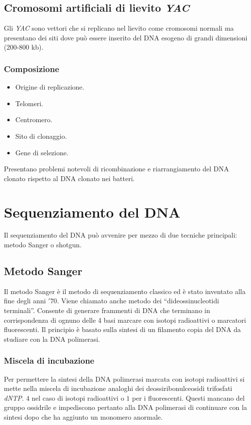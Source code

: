 	\subsection{Cromosomi artificiali di lievito \emph{YAC}}
	Gli \emph{YAC} sono vettori che si replicano nel lievito come cromosomi normali ma presentano dei siti dove pu\`o essere inserito del DNA esogeno di grandi dimensioni (200-800 kb).
	
		\subsubsection{Composizione}
		\begin{multicols}{2}
			\begin{itemize}
				\item Origine di replicazione.
				\item Telomeri.
				\item Centromero.
				\item Sito di clonaggio.
				\item Gene di selezione.
			\end{itemize}
		\end{multicols}
		Presentano problemi notevoli di ricombinazione e riarrangiamento del DNA clonato rispetto al DNA clonato nei batteri.

\section{Sequenziamento del DNA}
Il sequenziamento del DNA pu\`o avvenire per mezzo di due tecniche principali: metodo Sanger o shotgun.

	\subsection{Metodo Sanger}
	Il metodo Sanger \`e il metodo di sequenziamento classico ed \`e stato inventato alla fine degli anni $'70$. 
	Viene chiamato anche metodo dei ``dideossinucleotidi terminali''. 
	Consente di generare frammenti di DNA che terminano in corrispondenza di ognuno delle 4 basi marcare con isotopi radioattivi o marcatori fluorescenti. 
	Il principio \`e basato sulla sintesi di un filamento copia del DNA da studiare con la DNA polimerasi.

		\subsubsection{Miscela di incubazione}
		Per permettere la sintesi della DNA polimerasi marcata con isotopi radioattivi si mette nella miscela di incubazione analoghi dei deossiribonulceosidi trifosfati \emph{dNTP}.
		$4$ nel caso di isotopi radioattivi o $1$ per i fluorescenti.
		Questi mancano del gruppo ossidrile e impediscono pertanto alla DNA polimerasi di continuare con la sintesi dopo che ha aggiunto un monomero anormale.

